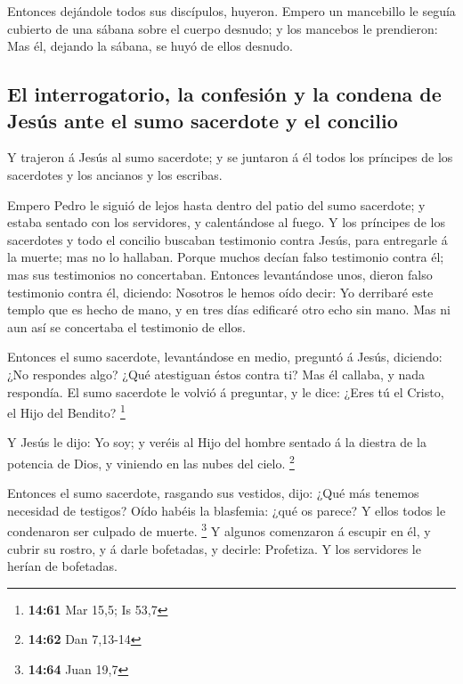  Entonces dejándole todos sus discípulos, huyeron.
 Empero un mancebillo le seguía cubierto de una sábana
sobre el cuerpo desnudo; y los mancebos le prendieron: 
Mas él, dejando la sábana, se huyó de ellos desnudo.

\hypertarget{el-interrogatorio-la-confesiuxf3n-y-la-condena-de-jesuxfas-ante-el-sumo-sacerdote-y-el-concilio}{%
\subsection{El interrogatorio, la confesión y la condena de Jesús ante
el sumo sacerdote y el
concilio}\label{el-interrogatorio-la-confesiuxf3n-y-la-condena-de-jesuxfas-ante-el-sumo-sacerdote-y-el-concilio}}

 Y trajeron á Jesús al sumo sacerdote; y se juntaron á él
todos los príncipes de los sacerdotes y los ancianos y los escribas.

 Empero Pedro le siguió de lejos hasta dentro del patio
del sumo sacerdote; y estaba sentado con los servidores, y calentándose
al fuego.  Y los príncipes de los sacerdotes y todo el
concilio buscaban testimonio contra Jesús, para entregarle á la muerte;
mas no lo hallaban.  Porque muchos decían falso
testimonio contra él; mas sus testimonios no concertaban.
 Entonces levantándose unos, dieron falso testimonio
contra él, diciendo:  Nosotros le hemos oído decir: Yo
derribaré este templo que es hecho de mano, y en tres días edificaré
otro echo sin mano.  Mas ni aun así se concertaba el
testimonio de ellos.

 Entonces el sumo sacerdote, levantándose en medio,
preguntó á Jesús, diciendo: ¿No respondes algo? ¿Qué atestiguan éstos
contra ti?  Mas él callaba, y nada respondía. El sumo
sacerdote le volvió á preguntar, y le dice: ¿Eres tú el Cristo, el Hijo
del Bendito? \footnote{\textbf{14:61} Mar 15,5; Is 53,7}

 Y Jesús le dijo: Yo soy; y veréis al Hijo del hombre
sentado á la diestra de la potencia de Dios, y viniendo en las nubes del
cielo. \footnote{\textbf{14:62} Dan 7,13-14}

 Entonces el sumo sacerdote, rasgando sus vestidos, dijo:
¿Qué más tenemos necesidad de testigos?  Oído habéis la
blasfemia: ¿qué os parece? Y ellos todos le condenaron ser culpado de
muerte. \footnote{\textbf{14:64} Juan 19,7}  Y algunos
comenzaron á escupir en él, y cubrir su rostro, y á darle bofetadas, y
decirle: Profetiza. Y los servidores le herían de bofetadas.

